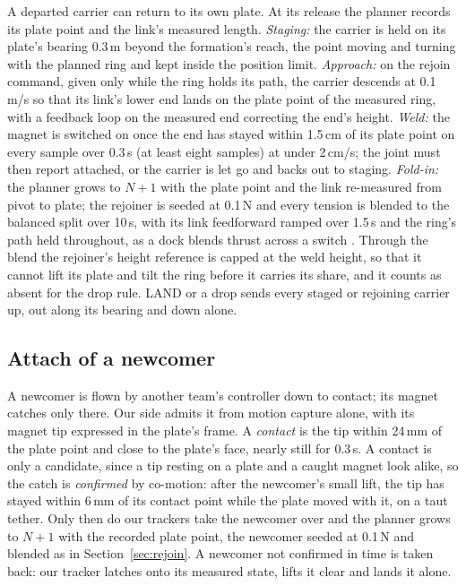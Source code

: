 A departed carrier can return to its own plate. At its release the planner records its plate point and the link's
measured length. \emph{Staging:} the carrier is held on its plate's bearing 0.3\,m beyond the formation's reach,
the point moving and turning with the planned ring and kept inside the position limit. \emph{Approach:} on the
rejoin command, given only while the ring holds its path, the carrier descends at 0.1\,m/s so that its link's
lower end lands on the plate point of the measured ring, with a feedback loop on the measured end correcting the
end's height. \emph{Weld:} the magnet is switched on once the end has stayed within 1.5\,cm of its plate point on
every sample over 0.3\,s (at least eight samples) at under 2\,cm/s; the joint must then report attached, or the
carrier is let go and backs out to staging. \emph{Fold-in:} the planner grows to $N+1$ with the plate point and the
link re-measured from pivot to plate; the rejoiner is seeded at 0.1\,N and every tension is blended to the balanced
split over 10\,s, with its link feedforward ramped over 1.5\,s and the ring's path held throughout, as a dock blends
thrust across a switch \cite{sugihara2023trady}. Through the blend the rejoiner's height reference is capped at the
weld height, so that it cannot lift its plate and tilt the ring before it carries its share, and it counts as absent
for the drop rule. LAND or a drop sends every staged or rejoining carrier up, out along its bearing and down alone.

\subsection{Attach of a newcomer}
\label{sec:attach}

A newcomer is flown by another team's controller down to contact; its magnet catches only there. Our side admits it
from motion capture alone, with its magnet tip expressed in the plate's frame. A \emph{contact} is the tip within
24\,mm of the plate point and close to the plate's face, nearly still for 0.3\,s. A contact is only a candidate, since
a tip resting on a plate and a caught magnet look alike, so the catch is \emph{confirmed} by co-motion: after the
newcomer's small lift, the tip has stayed within 6\,mm of its contact point while the plate moved with it, on a taut
tether. Only then do our trackers take the newcomer over and the planner grows to $N+1$ with the recorded plate
point, the newcomer seeded at 0.1\,N and blended as in Section~\ref{sec:rejoin}. A newcomer not confirmed in time is
taken back: our tracker latches onto its measured state, lifts it clear and lands it alone.
